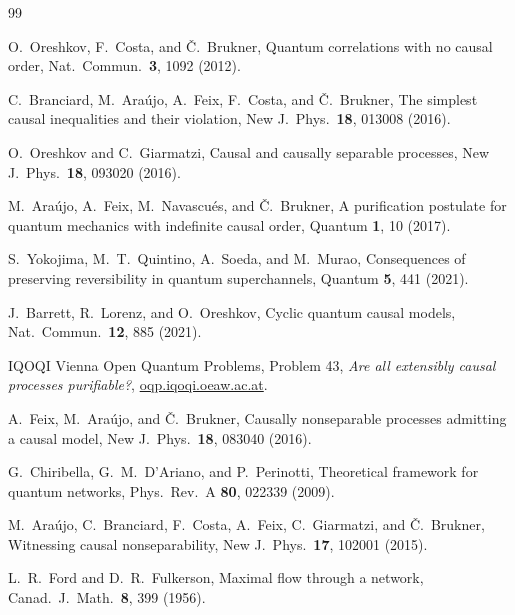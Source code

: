 \documentclass[aps,prl,reprint,superscriptaddress,nofootinbib,longbibliography,raggedbottom]{revtex4-2}
\begin{document}
\begin{thebibliography}{99}

O.~Oreshkov, F.~Costa, and \v{C}.~Brukner,
Quantum correlations with no causal order,
Nat.\ Commun.\ \textbf{3}, 1092 (2012).

C.~Branciard, M.~Ara\'ujo, A.~Feix, F.~Costa, and \v{C}.~Brukner,
The simplest causal inequalities and their violation,
New J.\ Phys.\ \textbf{18}, 013008 (2016).

O.~Oreshkov and C.~Giarmatzi,
Causal and causally separable processes,
New J.\ Phys.\ \textbf{18}, 093020 (2016).

M.~Ara\'ujo, A.~Feix, M.~Navascu\'es, and \v{C}.~Brukner,
A purification postulate for quantum mechanics with indefinite causal order,
Quantum \textbf{1}, 10 (2017).

S.~Yokojima, M.~T.~Quintino, A.~Soeda, and M.~Murao,
Consequences of preserving reversibility in quantum superchannels,
Quantum \textbf{5}, 441 (2021).

J.~Barrett, R.~Lorenz, and O.~Oreshkov,
Cyclic quantum causal models,
Nat.\ Commun.\ \textbf{12}, 885 (2021).

IQOQI Vienna Open Quantum Problems, Problem 43,
\emph{Are all extensibly causal processes purifiable?},
\href{https://oqp.iqoqi.oeaw.ac.at/are-all-extensibly-causal-processes-purifiable}{oqp.iqoqi.oeaw.ac.at}.

A.~Feix, M.~Ara\'ujo, and \v{C}.~Brukner,
Causally nonseparable processes admitting a causal model,
New J.\ Phys.\ \textbf{18}, 083040 (2016).

G.~Chiribella, G.~M.~D'Ariano, and P.~Perinotti,
Theoretical framework for quantum networks,
Phys.\ Rev.\ A \textbf{80}, 022339 (2009).

M.~Ara\'ujo, C.~Branciard, F.~Costa, A.~Feix, C.~Giarmatzi, and
\v{C}.~Brukner,
Witnessing causal nonseparability,
New J.\ Phys.\ \textbf{17}, 102001 (2015).

L.~R.~Ford and D.~R.~Fulkerson,
Maximal flow through a network,
Canad.\ J.\ Math.\ \textbf{8}, 399 (1956).

\end{thebibliography}
\end{document}
